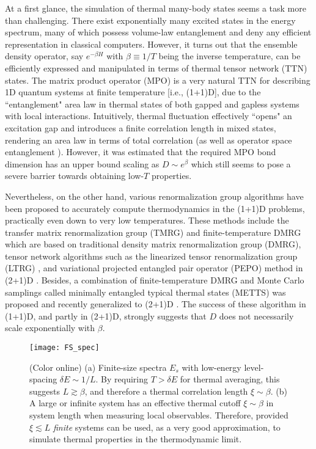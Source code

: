 \documentclass[aps,prx,twocolumn,showpacs,psfig,superscriptaddress,longbibliography]{revtex4-1}
\begin{document}
At a first glance, the simulation of thermal many-body states seems
a task more than challenging.  There exist exponentially many
excited states in the energy spectrum, many of which possess
volume-law entanglement and deny any efficient representation in
classical computers. However, it turns out that the ensemble density
operator, say $e^{-\beta H}$ with $\beta\equiv 1/T$ being the
inverse temperature, can be efficiently expressed and manipulated in
terms of thermal tensor network (TTN) states. The matrix product
operator (MPO) is a very natural TTN for describing 1D quantum
systems at finite temperature [i.e., (1+1)D], due to the
``entanglement" area law in thermal states of both gapped and
gapless systems with local interactions. Intuitively, thermal
fluctuation effectively ``opens" an excitation gap and introduces a
finite correlation length in mixed states, rendering an area law in
terms of total correlation \cite{Eisert.j+:2010:AreaLaws} (as well
as operator space entanglement \cite{Marko.z+:2008:Complexity}).
However, it was estimated that the required MPO bond dimension has
an upper bound scaling as $D \sim e^{\beta}$
\cite{Hastings.m.b:2006:Gapped} which still seems to pose a severe
barrier towards obtaining low-$T$ properties.

Nevertheless, on the other hand, various renormalization group
algorithms have been proposed to accurately compute thermodynamics
in the (1+1)D problems, practically even down to very low
temperatures.  These methods include the transfer matrix
renormalization group (TMRG) \cite{Bursill.r.j+:1996:DMRG,
Wang.x+:1997:TMRG, Xiang.t:1998:Thermodynamics} and
finite-temperature DMRG \cite{Feiguin.a.e+:2005:ftDMRG} which are
based on traditional density matrix renormalization group (DMRG),
tensor network algorithms such as the linearized tensor
renormalization group (LTRG) \cite{Li.w+:2011:LTRG,
Ran.s+:2012:Super-orthogonalization, Dong.y+:2017:BiLTRG}, and
variational projected entangled pair operator (PEPO) method in
(2+1)D \cite{Czarnik.p+:2012:PEPS, Czarnik.p+:2015:PEPS,
Czarnik.p+:2016:TNR}. Besides, a combination of finite-temperature
DMRG and Monte Carlo samplings called minimally entangled typical
thermal states (METTS) was proposed \cite{White.s.r:2009:METTS,
Stoudemire.e.m+:2010:METTS} and recently generalized to (2+1)D
\cite{Bruognolo.b+:2017:MPS}.  The success of these algorithm in
(1+1)D, and partly in (2+1)D, strongly suggests that $D$ does not
necessarily scale exponentially with $\beta$.

\begin{figure}[tb]
\texttt{[image: FS\_spec]}
\caption{(Color online) 
   (a) Finite-size spectra $E_s$ with low-energy
   level-spacing $\delta E \sim 1/L$. By requiring
   $T>\delta E$ for thermal averaging, this suggests
   $L\gtrsim\beta$, and therefore a thermal correlation
   length $\xi \sim \beta$.
   (b) A large or infinite system has an effective
   thermal cutoff $\xi\sim \beta$ in system length
   when measuring local observables. Therefore,
   provided  $\xi \lesssim L$ {\it finite} systems can 
   be used, as a very good approximation,
   to simulate thermal properties in the thermodynamic limit.}
\label{Fig:FS-spec}
\end{figure}
\end{document}
